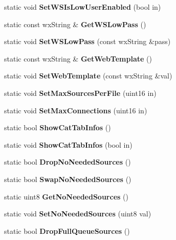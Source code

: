 \begin{DoxyCompactItemize}
\item 
static void {\bfseries SetWSIsLowUserEnabled} (bool in)\label{classCPreferences_a8c329b1d6303e3a39ad1d2d2dc57c15e}

\item 
static const wxString \& {\bfseries GetWSLowPass} ()\label{classCPreferences_ac1240bd49511d907fa2f8ca77f93d559}

\item 
static void {\bfseries SetWSLowPass} (const wxString \&pass)\label{classCPreferences_a493f72d01bb9ba038d1bf17927296a41}

\item 
static const wxString \& {\bfseries GetWebTemplate} ()\label{classCPreferences_a2834fb4cceb17d2d70b1f669e592198b}

\item 
static void {\bfseries SetWebTemplate} (const wxString \&val)\label{classCPreferences_a2d7de16817a037dc0efc077f49ae9e6f}

\item 
static void {\bfseries SetMaxSourcesPerFile} (uint16 in)\label{classCPreferences_ab43c123dff8992bf8336b0fbbf61fb69}

\item 
static void {\bfseries SetMaxConnections} (uint16 in)\label{classCPreferences_a3d5039d677e1dbe168625c487558c243}

\item 
static bool {\bfseries ShowCatTabInfos} ()\label{classCPreferences_a543d8baab78f4faa75b38dfa768e3d50}

\item 
static void {\bfseries ShowCatTabInfos} (bool in)\label{classCPreferences_a10777b323394e5d2ea214d275b13bd91}

\item 
static bool {\bfseries DropNoNeededSources} ()\label{classCPreferences_a78ae47e93101c898d0777e465a9b7ad7}

\item 
static bool {\bfseries SwapNoNeededSources} ()\label{classCPreferences_a86eeb917f76facc4e64a785eb28c0c30}

\item 
static uint8 {\bfseries GetNoNeededSources} ()\label{classCPreferences_a019977d34035c8ef7b774e89b42d95ca}

\item 
static void {\bfseries SetNoNeededSources} (uint8 val)\label{classCPreferences_a660d330f45dfaee04b2caafcaaf57ab6}

\item 
static bool {\bfseries DropFullQueueSources} ()\label{classCPreferences_ab03920fe25434de57116d0bf0fe30c72}


\end{DoxyCompactItemize}
